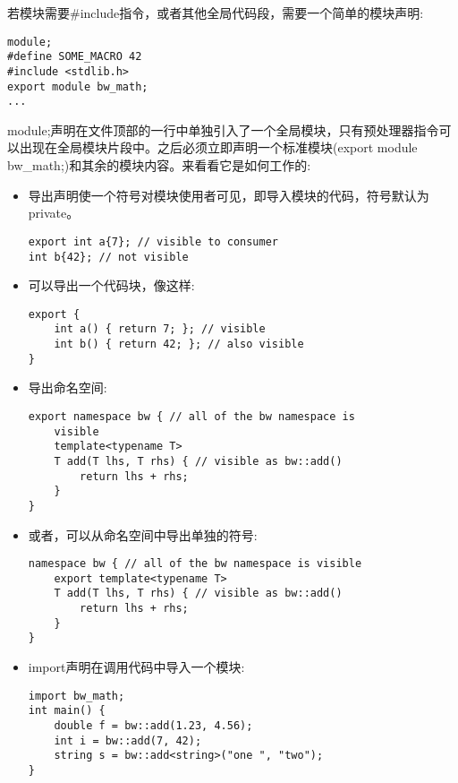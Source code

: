 若模块需要\#include指令，或者其他全局代码段，需要一个简单的模块声明:

\begin{lstlisting}[style=styleCXX]
module;
#define SOME_MACRO 42
#include <stdlib.h>
export module bw_math;
...
\end{lstlisting}

module;声明在文件顶部的一行中单独引入了一个全局模块，只有预处理器指令可以出现在全局模块片段中。之后必须立即声明一个标准模块(export module bw\_math;)和其余的模块内容。来看看它是如何工作的:

\begin{itemize}
\item 
导出声明使一个符号对模块使用者可见，即导入模块的代码，符号默认为private。

\begin{lstlisting}[style=styleCXX]
export int a{7}; // visible to consumer
int b{42}; // not visible
\end{lstlisting}

\item 
可以导出一个代码块，像这样:

\begin{lstlisting}[style=styleCXX]
export {
	int a() { return 7; }; // visible
	int b() { return 42; }; // also visible
}
\end{lstlisting}

\item 
导出命名空间:

\begin{lstlisting}[style=styleCXX]
export namespace bw { // all of the bw namespace is
	visible
	template<typename T>
	T add(T lhs, T rhs) { // visible as bw::add()
		return lhs + rhs;
	}
}
\end{lstlisting}

\item 
或者，可以从命名空间中导出单独的符号:

\begin{lstlisting}[style=styleCXX]
namespace bw { // all of the bw namespace is visible
	export template<typename T>
	T add(T lhs, T rhs) { // visible as bw::add()
		return lhs + rhs;
	}
}
\end{lstlisting}

\item 
import声明在调用代码中导入一个模块:

\begin{lstlisting}[style=styleCXX]
import bw_math;
int main() {
	double f = bw::add(1.23, 4.56);
	int i = bw::add(7, 42);
	string s = bw::add<string>("one ", "two");
}
\end{lstlisting}


\end{itemize}
